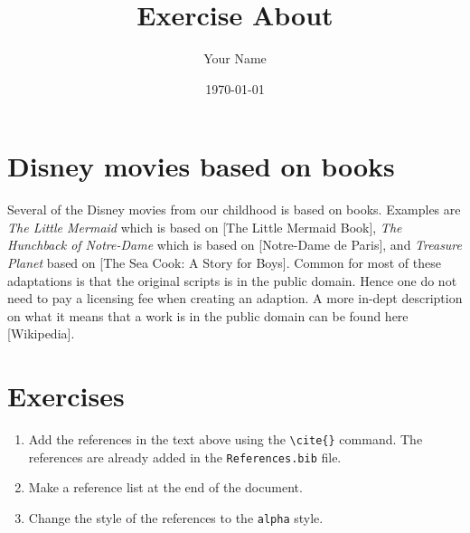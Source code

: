 \documentclass{article}
\title{Exercise About \BibTeX{}}
\author{Your Name}
\date{\today}
\begin{document}
\maketitle
\section{Disney movies based on books}

Several of the Disney movies from our childhood is based on books. Examples are \textit{The Little Mermaid} which is based on [The Little Mermaid Book], \textit{The Hunchback of Notre-Dame} which is based on [Notre-Dame de Paris], and \textit{Treasure Planet} based on [The Sea Cook: A Story for Boys]. Common for most of these adaptations is that the original scripts is in the public domain. Hence one do not need to pay a licensing fee when creating an adaption. A more in-dept description on what it means that a work is in the public domain can be found here [Wikipedia].

\section{Exercises}
\begin{enumerate}
    \item Add the references in the text above using the \verb+\cite{}+ command. The references are already added in the \texttt{References.bib} file.
    \item Make a reference list at the end of the document.
    \item Change the style of the references to the \texttt{alpha} style.
\end{enumerate}
\end{document}

